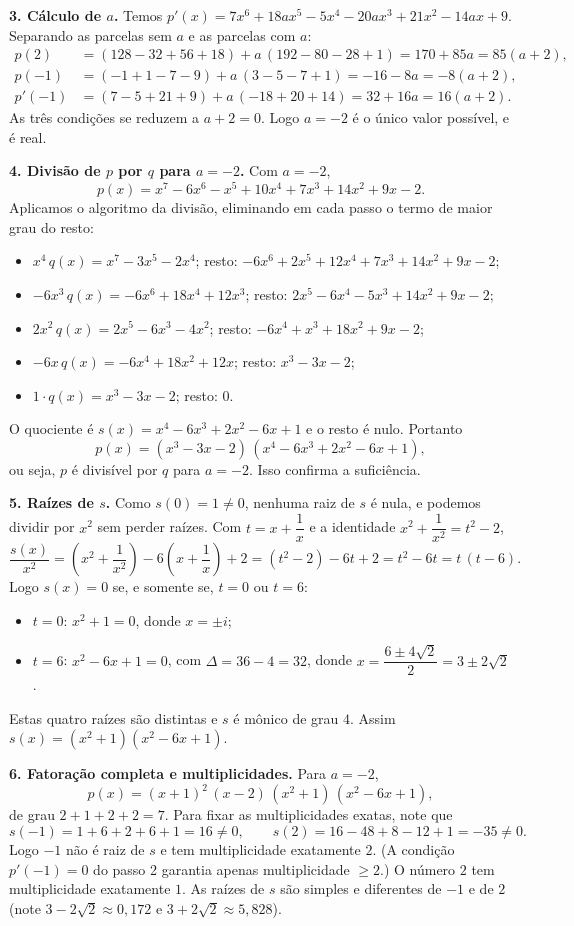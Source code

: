 \documentclass{article}%
\begin{document}
\textbf{3. Cálculo de $a$.} Temos $p'(x)=7x^6+18ax^5-5x^4-20ax^3+21x^2-14ax+9$. Separando as parcelas sem $a$ e as parcelas com $a$:
\begin{align*}
p(2)&=(128-32+56+18)+a\,(192-80-28+1)=170+85a=85(a+2),\\
p(-1)&=(-1+1-7-9)+a\,(3-5-7+1)=-16-8a=-8(a+2),\\
p'(-1)&=(7-5+21+9)+a\,(-18+20+14)=32+16a=16(a+2).
\end{align*}
As três condições se reduzem a $a+2=0$. Logo $a=-2$ é o único valor possível, e é real.

\textbf{4. Divisão de $p$ por $q$ para $a=-2$.} Com $a=-2$,
\[
p(x)=x^7-6x^6-x^5+10x^4+7x^3+14x^2+9x-2.
\]
Aplicamos o algoritmo da divisão, eliminando em cada passo o termo de maior grau do resto:
\begin{itemize}
\item $x^4\,q(x)=x^7-3x^5-2x^4$; resto: $-6x^6+2x^5+12x^4+7x^3+14x^2+9x-2$;
\item $-6x^3\,q(x)=-6x^6+18x^4+12x^3$; resto: $2x^5-6x^4-5x^3+14x^2+9x-2$;
\item $2x^2\,q(x)=2x^5-6x^3-4x^2$; resto: $-6x^4+x^3+18x^2+9x-2$;
\item $-6x\,q(x)=-6x^4+18x^2+12x$; resto: $x^3-3x-2$;
\item $1\cdot q(x)=x^3-3x-2$; resto: $0$.
\end{itemize}
O quociente é $s(x)=x^4-6x^3+2x^2-6x+1$ e o resto é nulo. Portanto
\[
p(x)=(x^3-3x-2)\,(x^4-6x^3+2x^2-6x+1),
\]
ou seja, $p$ é divisível por $q$ para $a=-2$. Isso confirma a suficiência.

\textbf{5. Raízes de $s$.} Como $s(0)=1\neq0$, nenhuma raiz de $s$ é nula, e podemos dividir por $x^2$ sem perder raízes. Com $t=x+\dfrac{1}{x}$ e a identidade $x^2+\dfrac{1}{x^2}=t^2-2$,
\[
\frac{s(x)}{x^2}=\left(x^2+\frac{1}{x^2}\right)-6\left(x+\frac{1}{x}\right)+2=(t^2-2)-6t+2=t^2-6t=t\,(t-6).
\]
Logo $s(x)=0$ se, e somente se, $t=0$ ou $t=6$:
\begin{itemize}
\item $t=0$: $x^2+1=0$, donde $x=\pm i$;
\item $t=6$: $x^2-6x+1=0$, com $\Delta=36-4=32$, donde $x=\dfrac{6\pm4\sqrt{2}}{2}=3\pm2\sqrt{2}$.
\end{itemize}
Estas quatro raízes são distintas e $s$ é mônico de grau $4$. Assim $s(x)=(x^2+1)(x^2-6x+1)$.

\textbf{6. Fatoração completa e multiplicidades.} Para $a=-2$,
\[
p(x)=(x+1)^2\,(x-2)\,(x^2+1)\,(x^2-6x+1),
\]
de grau $2+1+2+2=7$. Para fixar as multiplicidades exatas, note que
\[
s(-1)=1+6+2+6+1=16\neq0,\qquad s(2)=16-48+8-12+1=-35\neq0.
\]
Logo $-1$ não é raiz de $s$ e tem multiplicidade exatamente $2$. (A condição $p'(-1)=0$ do passo 2 garantia apenas multiplicidade $\geq 2$.) O número $2$ tem multiplicidade exatamente $1$. As raízes de $s$ são simples e diferentes de $-1$ e de $2$ (note $3-2\sqrt{2}\approx0{,}172$ e $3+2\sqrt{2}\approx5{,}828$).
\end{document}
